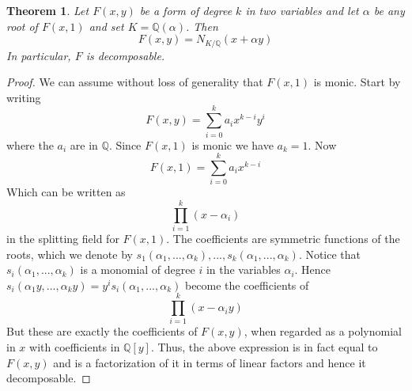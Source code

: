 \documentclass{article}
\newtheorem{theorem}{Theorem}[section]
\newcommand{\mbb}[1]{\mathbb{#1}}
\begin{document}
\begin{theorem}\label{thm: Forms in two variables are decomposable}
    Let $F(x, y)$ be a form of degree $k$ in two variables and let $\alpha$ be any root of $F(x, 1)$ and set $K = \mbb Q(\alpha)$. Then 
    $$F(x, y) = N_{K / \mbb Q}(x + \alpha y)$$ 
    In particular, $F$ is decomposable.
\end{theorem}
\begin{proof}
    We can assume without loss of generality that $F(x, 1)$ is monic. Start by writing
    $$F(x, y) = \sum_{i=0}^k a_i x^{k-i} y^i$$
    where the $a_i$ are in $\mbb{Q}$. Since $F(x, 1)$ is monic we have $a_k = 1$. Now 
    $$F(x, 1) = \sum_{i=0}^k a_i x^{k-i}$$
    Which can be written as
    $$\prod_{i=1}^k (x - \alpha_i)$$
    in the splitting field for $F(x,1)$. The coefficients are symmetric functions of the roots, which we denote by $s_1(\alpha_1, ..., \alpha_k), ..., s_k(\alpha_1, ..., \alpha_k)$. Notice that $s_i(\alpha_1, ..., \alpha_k)$ is a monomial of degree $i$ in the variables $\alpha_i$. Hence $s_i(\alpha_1y, ..., \alpha_k y) = y^i s_i(\alpha_1, ..., \alpha_k)$ become the coefficients of 
    $$\prod_{i=1}^k (x - \alpha_iy)$$
    But these are exactly the coefficients of $F(x,y)$, when regarded as a polynomial in $x$ with coefficients in $\mbb{Q}[y]$. Thus, the above expression is in fact equal to $F(x,y)$ and is a factorization of it in terms of linear factors and hence it decomposable.
\end{proof}
\end{document}
